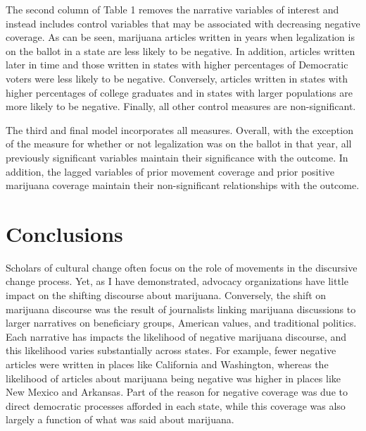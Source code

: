 


%


%


%

The second column of Table 1 removes the narrative variables of interest and instead includes control variables that may be associated with decreasing negative coverage. As can be seen, marijuana articles written in years when legalization is on the ballot in a state are less likely to be negative. In addition, articles written later in time and those written in states with higher percentages of Democratic voters were less likely to be negative. Conversely, articles written in states with higher percentages of college graduates and in states with larger populations are more likely to be negative. Finally, all other control measures are non-significant. 


The third and final model incorporates all measures. Overall, with the exception of the measure for whether or not legalization was on the ballot in that year, all previously significant variables maintain their significance with the outcome. In addition, the lagged variables of prior movement coverage and prior positive marijuana coverage maintain their non-significant relationships with the outcome. 

\section{Conclusions} 

Scholars of cultural change often focus on the role of movements in the discursive change process. 
Yet, as I have demonstrated, advocacy organizations have little impact on the shifting discourse about marijuana. Conversely, the shift on marijuana discourse was the result of journalists linking marijuana discussions to larger narratives on beneficiary groups, American values, and traditional politics. Each narrative has impacts the likelihood of negative marijuana discourse, and this likelihood varies substantially across states. For example, fewer negative articles were written in places like California and Washington, whereas the likelihood of articles about marijuana being negative was higher in places like New Mexico and Arkansas. Part of the reason for negative coverage was due to direct democratic processes afforded in each state, while this coverage was also largely a function of what was said about marijuana. 

